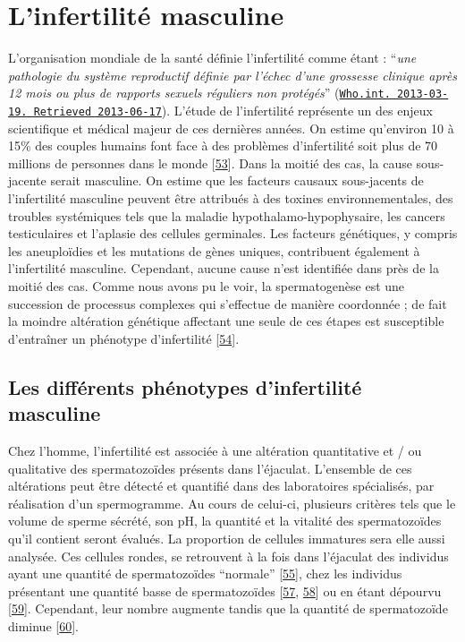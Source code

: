 \documentclass[12pt,a4paper,twoside]{ugathesis}
\theoremstyle{definition}
\theoremstyle{definition}
\theoremstyle{definition}
\theoremstyle{remark}
\begin{document}
\newpage

\section{L'infertilité masculine}\label{linfertilite-masculine}

L'organisation mondiale de la santé définie l'infertilité comme étant :
``\emph{une pathologie du système reproductif définie par l'échec d'une
grossesse clinique après 12 mois ou plus de rapports sexuels réguliers
non protégés}''
(\href{http://www.who.int/reproductivehealth/topics/infertility/definitions/en/}{\texttt{Who.int.\ 2013-03-19.\ Retrieved\ 2013-06-17}}).
L'étude de l'infertilité représente un des enjeux scientifique et
médical majeur de ces dernières années. On estime qu'environ 10 à 15\%
des couples humains font face à des problèmes d'infertilité soit plus de
70 millions de personnes dans le monde
{[}\protect\hyperlink{ref-Boivin2007a}{53}{]}. Dans la moitié des cas,
la cause sous-jacente serait masculine. On estime que les facteurs
causaux sous-jacents de l'infertilité masculine peuvent être attribués à
des toxines environnementales, des troubles systémiques tels que la
maladie hypothalamo-hypophysaire, les cancers testiculaires et l'aplasie
des cellules germinales. Les facteurs génétiques, y compris les
aneuploïdies et les mutations de gènes uniques, contribuent également à
l'infertilité masculine. Cependant, aucune cause n'est identifiée dans
près de la moitié des cas. Comme nous avons pu le voir, la
spermatogenèse est une succession de processus complexes qui s'effectue
de manière coordonnée ; de fait la moindre altération génétique
affectant une seule de ces étapes est susceptible d'entraîner un
phénotype d'infertilité
{[}\protect\hyperlink{ref-Grudzinskas1995}{54}{]}.

\subsection{Les différents phénotypes d'infertilité
masculine}\label{les-differents-phenotypes-dinfertilite-masculine}

Chez l'homme, l'infertilité est associée à une altération quantitative
et / ou qualitative des spermatozoïdes présents dans l'éjaculat.
L'ensemble de ces altérations peut être détecté et quantifié dans des
laboratoires spécialisés, par réalisation d'un spermogramme. Au cours de
celui-ci, plusieurs critères tels que le volume de sperme sécrété, son
pH, la quantité et la vitalité des spermatozoïdes qu'il contient seront
évalués. La proportion de cellules immatures sera elle aussi analysée.
Ces cellules rondes, se retrouvent à la fois dans l'éjaculat des
individus ayant une quantité de spermatozoïdes ``normale''
{[}\protect\hyperlink{ref-Michael1937}{55}{]}, chez les individus
présentant une quantité basse de spermatozoïdes
{[}\protect\hyperlink{ref-MacLeod1970}{57},
\protect\hyperlink{ref-Tomlinson1993}{58}{]} ou en étant dépourvu
{[}\protect\hyperlink{ref-Kurilo}{59}{]}. Cependant, leur nombre
augmente tandis que la quantité de spermatozoïde diminue
{[}\protect\hyperlink{ref-SPERLING1971}{60}{]}.
\end{document}
